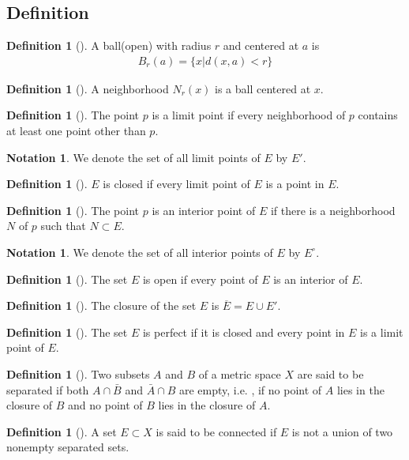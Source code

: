 \documentclass[	DIV=calc,paper=a4,fontsize=11pt]{scrartcl}	 	%
\theoremstyle{definition}
\newtheorem{defn}[thm]{Definition}
\newtheorem{notn}[thm]{Notation}
\theoremstyle{plain}
\theoremstyle{remark}
\begin{document}
\subsection{Definition}
\begin{defn}[\textbf{\color{blue}{Ball}}] A ball(open) with radius $r$ and centered at $a$ is
\begin{align}
B_{r}(a)=\{x|d(x,a)<r\}
\end{align}
\end{defn}

\begin{defn}[\textbf{\color{blue}{Neighborhood}}] A neighborhood $N_r(x)$ is a ball centered at $x$.
\end{defn}

\begin{defn}[\textbf{\color{blue}{Limit point}}]
The point $p$ is a limit point if every neighborhood of $p$ contains at least one point other than $p$.
\end{defn}

\begin{notn}
We denote the set of all limit points of $E$ by $E'$.
\end{notn}

\begin{defn}[\textbf{\color{blue}{Closed}}]
$E$ is closed if every limit point of $E$ is a point in $E$.
\end{defn}

\begin{defn}[\textbf{\color{blue}{Interior}}]
The point $p$ is an interior point of $E$ if there is a neighborhood $N$ of $p$ such that $N\subset E$.
\end{defn}


\begin{notn}
We denote the set of all interior points of $E$ by $E^{\circ}$.
\end{notn}

\begin{defn}[\textbf{\color{blue}{Open}}]
The set $E$ is open if every point of $E$ is an interior of $E$.
\end{defn}

\begin{defn}[\textbf{\color{blue}{Closure}}]
The closure of the set $E$ is $\overline{E}=E\cup E'$.
\end{defn}
\begin{defn}[\textbf{\color{blue}{Perfect}}]
The set $E$ is perfect if it is closed and every point in $E$ is a limit point of $E$.
\end{defn}
\begin{defn}[\textbf{\color{blue}{Separated}}]
Two subsets $A$ and $B$ of a metric space $X$ are said to be separated if both $A\cap\bar{B}$ and $\bar{A} \cap B$ are empty, i.e. , if no point of $A$ lies in the closure of $B$ and no point of $B$ lies in the closure of $A$.
\end{defn}
\begin{defn}[\textbf{\color{blue}{Connected}}]
A set $E\subset X$ is said to be connected if $E$ is not a union of two nonempty separated sets.
\end{defn}
\end{document}
